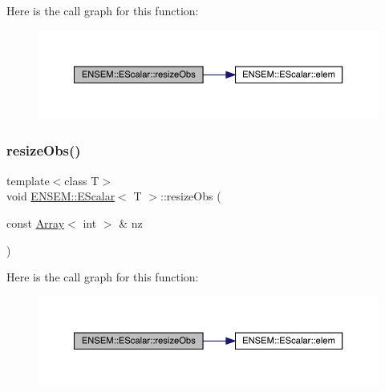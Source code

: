 Here is the call graph for this function\+:
\nopagebreak
\begin{figure}[H]
\begin{center}
\leavevmode
\includegraphics[width=350pt]{d0/d82/classENSEM_1_1EScalar_a1849b1cf66ab1a983ca9e1f268afd109_cgraph}
\end{center}
\end{figure}
\mbox{\label{classENSEM_1_1EScalar_a9273a529024099effecf6962eafa044e}} 
\subsubsection{\texorpdfstring{resizeObs()}{resizeObs()}\hspace{0.1cm}{\footnotesize\ttfamily [10/12]}}
{\footnotesize\ttfamily template$<$class T$>$ \\
void \mbox{\hyperlink{classENSEM_1_1EScalar}{E\+N\+S\+E\+M\+::\+E\+Scalar}}$<$ T $>$\+::resize\+Obs (\begin{DoxyParamCaption}\item[{const \mbox{\hyperlink{classXMLArray_1_1Array}{Array}}$<$ int $>$ \&}]{nz }\end{DoxyParamCaption})\hspace{0.3cm}{\ttfamily [inline]}}

Here is the call graph for this function\+:
\nopagebreak
\begin{figure}[H]
\begin{center}
\leavevmode
\includegraphics[width=350pt]{d0/d82/classENSEM_1_1EScalar_a9273a529024099effecf6962eafa044e_cgraph}
\end{center}
\end{figure}
\mbox{\label{classENSEM_1_1EScalar_a9273a529024099effecf6962eafa044e}} 
